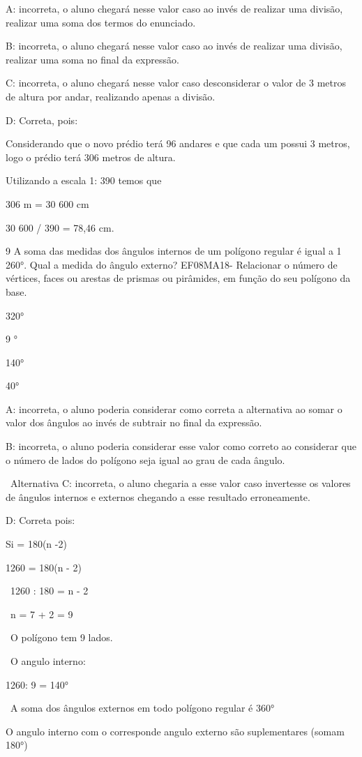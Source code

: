 A: incorreta, o aluno chegará nesse valor caso ao invés de realizar uma
divisão, realizar uma soma dos termos do enunciado.

B: incorreta, o aluno chegará nesse valor caso ao invés de realizar uma
divisão, realizar uma soma no final da expressão.

C: incorreta, o aluno chegará nesse valor caso desconsiderar o valor de
3 metros de altura por andar, realizando apenas a divisão.

D: Correta, pois:

Considerando que o novo prédio terá 96 andares e que cada um possui 3
metros, logo o prédio terá 306 metros de altura.

Utilizando a escala 1: 390 temos que

306 m = 30 600 cm

30 600 / 390 = 78,46 cm.

\num{9} A soma das medidas dos ângulos internos de um polígono regular é
igual a 1 260°. Qual a medida do ângulo externo? EF08MA18- Relacionar o
número de vértices, faces ou arestas de prismas ou pirâmides, em função
do seu polígono da base.

\item 320°
\item 9 °
\item 140°
\item 40°

A: incorreta, o aluno poderia considerar como correta a alternativa ao
somar o valor dos ângulos ao invés de subtrair no final da expressão.

B: incorreta, o aluno poderia considerar esse valor como correto ao
considerar que o número de lados do polígono seja igual ao grau de cada
ângulo.

~Alternativa C: incorreta, o aluno chegaria a esse valor caso invertesse
os valores de ângulos internos e externos chegando a esse resultado
erroneamente.

D: Correta pois:

Si = 180(n -2)

1260 = 180(n - 2)

~1260 : 180 = n - 2

~n = 7 + 2 = 9

~O polígono tem 9 lados.

~O angulo interno:

1260: 9 = 140°

~A soma dos ângulos externos em todo polígono regular é 360°

O angulo interno com o corresponde angulo externo são suplementares
(somam 180°)

